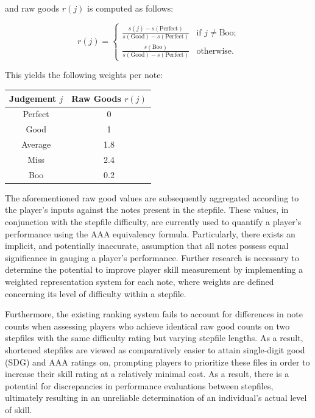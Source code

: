 and raw goods $r(j)$ is computed as follows:

\begin{equation*}
	r(j) = 
	\begin{cases}
		\displaystyle \frac{s(j) - s(\text{Perfect})}{s(\text{Good}) - s(\text{Perfect})}
		  &   
		\text{if $j \neq \text{Boo}$;}
		\\[10pt]
		\displaystyle \frac{s(\text{Boo})}{s(\text{Good}) - s(\text{Perfect})}
		  &   
		\text{otherwise.}
	\end{cases}
\end{equation*}

This yields the following weights per note:

\begin{center}
	\begin{tabular}{c@{\hskip 5mm}c}
		\hspace{5mm} \textbf{Judgement} $j$ \hspace{5mm} & \textbf{Raw Goods} $r(j)$ \\
            \hline
		Perfect                               & 0                         \\
		Good                                  & 1                         \\
		Average                               & 1.8                       \\
		Miss                                  & 2.4                       \\
		Boo                                   & 0.2                       \\
	\end{tabular}
\end{center}

The aforementioned raw good values are subsequently aggregated according to the player's inputs against the notes present in the stepfile. These values, in conjunction with the stepfile difficulty, are currently used to quantify a player's performance using the AAA equivalency formula. Particularly, there exists an implicit, and potentially inaccurate, assumption that all notes possess equal significance in gauging a player's performance. Further research is necessary to determine the potential to improve player skill measurement by implementing a weighted representation system for each note, where weights are defined concerning its level of difficulty within a stepfile. 

\vspace{2mm}

Furthermore, the existing ranking system fails to account for differences in note counts when assessing players who achieve identical raw good counts on two stepfiles with the same difficulty rating but varying stepfile lengths. As a result, shortened stepfiles are viewed as comparatively easier to attain single-digit good (SDG) and AAA ratings on, prompting players to prioritize these files in order to increase their skill rating at a relatively minimal cost. As a result, there is a potential for discrepancies in performance evaluations between stepfiles, ultimately resulting in an unreliable determination of an individual's actual level of skill.

